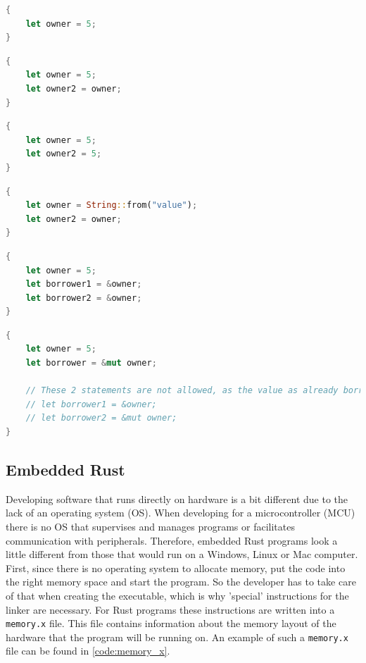 \begin{lstlisting}[style=colorEX,language=Rust,caption={Simple example of a value and it's owner},label={code:owner}]
{
    let owner = 5;
}
\end{lstlisting}


\begin{lstlisting}[style=colorEX,language=Rust,caption={Simple example of a copy},label={code:copy}]
{
    let owner = 5;
    let owner2 = owner;
}
\end{lstlisting}

\begin{lstlisting}[style=colorEX,language=Rust,caption={Simple example of two owners},label={code:two_owners}]
{
    let owner = 5;
    let owner2 = 5;
}
\end{lstlisting}

\begin{lstlisting}[style=colorEX,language=Rust,caption={Simple example of a move},label={code:move}]
{
    let owner = String::from("value");
    let owner2 = owner;
}
\end{lstlisting}

\begin{lstlisting}[style=colorEX,language=Rust,caption={Simple example of a immutable borrow},label={code:borrow}]
{
    let owner = 5;
    let borrower1 = &owner;
    let borrower2 = &owner;
}
\end{lstlisting}

\begin{lstlisting}[style=colorEX,language=Rust,caption={Simple example of a mutable borrow},label={code:mut_borrow}]
{
    let owner = 5;
    let borrower = &mut owner;

    // These 2 statements are not allowed, as the value as already borrowed as mutable.
    // let borrower1 = &owner;
    // let borrower2 = &mut owner;
}
\end{lstlisting}


\subsection{Embedded Rust}

Developing software that runs directly on hardware is a bit different due to the lack of an operating system (OS).
When developing for a microcontroller (MCU) there is no OS that supervises and manages programs or facilitates communication with peripherals.
Therefore, embedded Rust programs look a little different from those that would run on a Windows, Linux or Mac computer.
\\
First, since there is no operating system to allocate memory, put the code into the right memory space and start the program.
So the developer has to take care of that when creating the executable, which is why 'special' instructions for the linker are necessary.
For Rust programs these instructions are written into a \lstinline{memory.x} file.
This file contains information about the memory layout of the hardware that the program will be running on.
An example of such a \lstinline{memory.x} file can be found in \ref{code:memory_x}.

